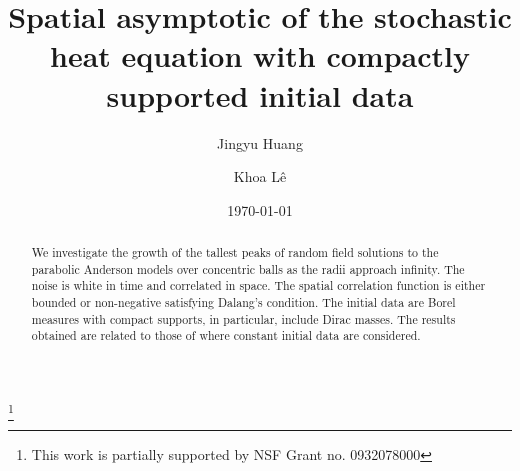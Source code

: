 \documentclass[12pt,reqno]{amsart}
\theoremstyle{remark}
\newcommand{\1}{\mathbf{1}}
\begin{document}
\title{Spatial asymptotic of the stochastic heat equation with compactly supported initial data}
\author{Jingyu Huang}
\author{Khoa L\^e}
\address{Department of Mathematics, University of Utah, Salt Lake City, Utah, 84112, USA}
\address{Department of Mathematical and Statistical Sciences, University of Alberta, 632 Central Academic, Edmonton , AB T6G 2R3, Canada}
\thanks{This work is partially supported by NSF Grant no. 0932078000}
\date{\today}
\begin{abstract}
	We investigate the growth of the tallest peaks of random field solutions to the parabolic Anderson models over concentric balls as the radii approach infinity. The noise is white in time and correlated in space. The spatial correlation function is either bounded or non-negative satisfying Dalang's condition. The initial data are Borel measures with compact supports, in particular, include Dirac masses. The results obtained are related to those of \cites{MR3098071,MR3474477} where constant initial data are considered. 
\end{abstract}
\maketitle
\end{document}

